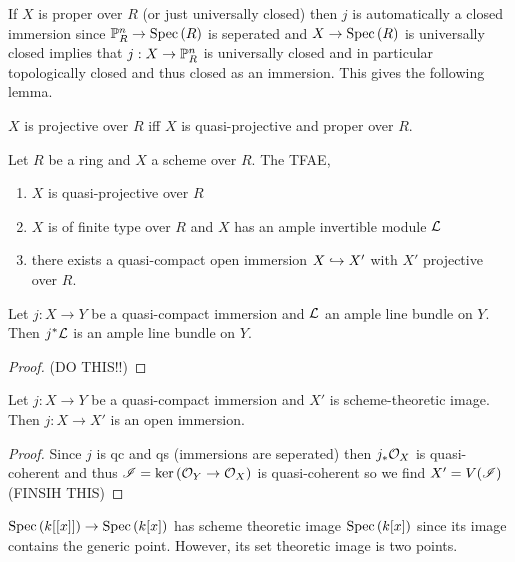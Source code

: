 \documentclass[12pt]{article}
\begin{document}
\begin{rmk}
If $X$ is proper over $R$ (or just universally closed) then $j$ is automatically a closed immersion since $\P^n_R \to \Spec{R}$ is seperated and $X \to \Spec{R}$ is universally closed implies that $j : X \to \P^n_R$ is universally closed and in particular topologically closed and thus closed as an immersion. This gives the following lemma.
\end{rmk}

\begin{lemma}
$X$ is projective over $R$ iff $X$ is quasi-projective and proper over $R$.
\end{lemma}

\begin{theorem}
Let $R$ be a ring and $X$ a scheme over $R$. The TFAE,
\begin{enumerate}
\item $X$ is quasi-projective over $R$
\item $X$ is of finite type over $R$ and $X$ has an ample invertible module $\L$
\item there exists a quasi-compact open immersion $X \embed X'$ with $X'$ projective over $R$. 
\end{enumerate}
\end{theorem}

\begin{lemma}
Let $j : X \to Y$ be a quasi-compact immersion and $\L$ an ample line bundle on $Y$. Then $j^* \L$ is an ample line bundle on $Y$.
\end{lemma}

\begin{proof}
(DO THIS!!)
\end{proof}

\begin{lemma}
Let $j : X \to Y$ be a quasi-compact immersion and $X'$ is scheme-theoretic image. Then $j : X \to X'$ is an open immersion.
\end{lemma}

\begin{proof}
Since $j$ is qc and qs (immersions are seperated) then $j_* \struct{X}$ is quasi-coherent and thus $\I = \ker{(\struct{Y} \to \struct{X})}$ is quasi-coherent so we find $X' = V(\I)$
(FINSIH THIS)
\end{proof}

\begin{example}
$\Spec{k[[x]]} \to \Spec{k[x]}$ has scheme theoretic image $\Spec{k[x]}$ since its image contains the generic point. However, its set theoretic image is two points. 
\end{example}
\end{document}
